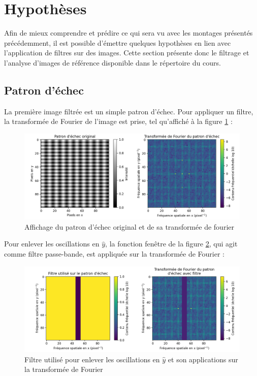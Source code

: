 \documentclass[11pt,letterpaper]{article}
\begin{document}
\section{Hypothèses}

Afin de mieux comprendre et prédire ce qui sera vu avec les montages présentés précédemment, il est possible d'émettre quelques hypothèses en lien avec l'application de filtres sur des images. Cette section présente donc le filtrage et l'analyse d'images de référence disponible dans le répertoire du cours.

\subsection{Patron d'échec}

La première image filtrée est un simple patron d'échec. Pour appliquer un filtre, la transformée de Fourier de l'image est prise, tel qu'affiché à la figure \ref{echec_patron} :

\begin{figure}[H]
  \centering
  \includegraphics[scale=0.68]{check.png}
  \caption{Affichage du patron d'échec original et de sa transformée de fourier}
  \label{echec_patron}
\end{figure}

Pour enlever les oscillations en $\hat{y}$, la fonction fenêtre de la figure \ref{echec_filtre}, qui agit comme filtre passe-bande, est appliquée sur la transformée de Fourier :

\begin{figure}[H]
  \centering
  \includegraphics[scale=0.68]{check_mask.png}
  \caption{Filtre utilisé pour enlever les oscillations en $\hat{y}$ et son applications sur la transformée de Fourier}
  \label{echec_filtre}
\end{figure}
\end{document}
